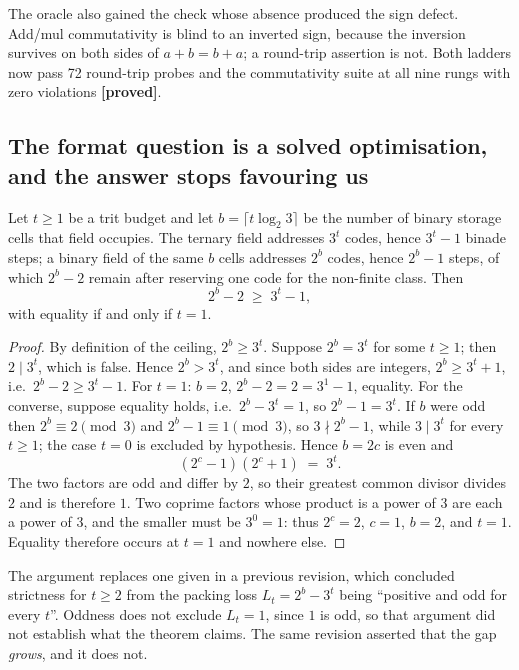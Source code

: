The oracle also gained the check whose absence produced the sign defect. Add/mul
commutativity is blind to an inverted sign, because the inversion survives on both
sides of $a+b=b+a$; a round-trip assertion is not. Both ladders now pass 72
round-trip probes and the commutativity suite at all nine rungs with zero
violations \textbf{[proved]}.

\subsection{The format question is a solved optimisation, and the answer stops favouring us}
\label{sec:variantB}

\begin{theorem}
\label{thm:rangeperbit}
Let $t \ge 1$ be a trit budget and let $b = \lceil t\log_2 3\rceil$ be the number
of binary storage cells that field occupies. The ternary field addresses $3^t$
codes, hence $3^t - 1$ binade steps; a binary field of the same $b$ cells
addresses $2^b$ codes, hence $2^b - 1$ steps, of which $2^b - 2$ remain after
reserving one code for the non-finite class. Then
\[
2^b - 2 \;\ge\; 3^t - 1,
\]
with equality if and only if $t = 1$.
\end{theorem}

\begin{proof}
By definition of the ceiling, $2^b \ge 3^t$. Suppose $2^b = 3^t$ for some
$t \ge 1$; then $2 \mid 3^t$, which is false. Hence $2^b > 3^t$, and since both
sides are integers, $2^b \ge 3^t + 1$, i.e.\ $2^b - 2 \ge 3^t - 1$. For $t = 1$:
$b = 2$, $2^b - 2 = 2 = 3^1 - 1$, equality. For the converse, suppose equality
holds, i.e.\ $2^b - 3^t = 1$, so $2^b - 1 = 3^t$. If $b$ were odd then
$2^b \equiv 2 \pmod 3$ and $2^b - 1 \equiv 1 \pmod 3$, so $3 \nmid 2^{b}-1$, while
$3 \mid 3^{t}$ for every $t \ge 1$; the case $t = 0$ is excluded by hypothesis. Hence $b = 2c$ is even and
\[
  (2^{c}-1)(2^{c}+1) \;=\; 3^{t}.
\]
The two factors are odd and differ by $2$, so their greatest common divisor
divides $2$ and is therefore $1$. Two coprime factors whose product is a power of
$3$ are each a power of $3$, and the smaller must be $3^0 = 1$: thus $2^{c} = 2$,
$c = 1$, $b = 2$, and $t = 1$. Equality therefore occurs at $t = 1$ and nowhere
else.
\end{proof}

The argument replaces one given in a previous revision, which concluded strictness
for $t \ge 2$ from the packing loss $L_t = 2^{b} - 3^{t}$ being ``positive and odd
for every $t$''. Oddness does not exclude $L_t = 1$, since $1$ is odd, so that
argument did not establish what the theorem claims. The same revision asserted
that the gap \emph{grows}, and it does not.

